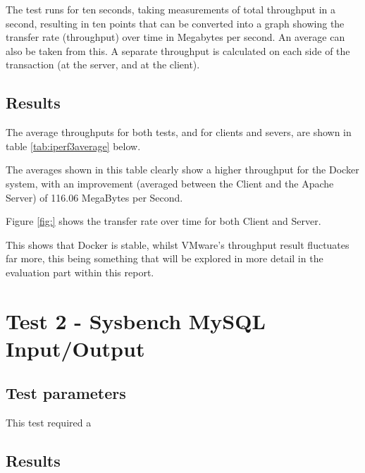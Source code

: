 The test runs for ten seconds, taking measurements of total throughput in a second, resulting in ten points that can be converted into a graph showing the transfer rate (throughput) over time in Megabytes per second. An average can also be taken from this. A separate throughput is calculated on each side of the transaction (at the server, and at the client).
 
\subsection{Results}
The average throughputs for both tests, and for clients and severs, are shown in table \ref{tab:iperf3average} below.

\begin{table}[H]
\centering
\caption{Table showing the average transfer rate in a 10 second period}
\label{tab:iperf3average}
\end{table}

The averages shown in this table clearly show a higher throughput for the Docker system, with an improvement (averaged between the Client and the Apache Server) of 116.06 MegaBytes per Second.

Figure \ref{fig:} shows the transfer rate over time for both Client and Server.


This shows that Docker is stable, whilst VMware's throughput result fluctuates far more, this being something that will be explored in more detail in the evaluation part within this report.

\section{Test 2 - Sysbench MySQL Input/Output}
\subsection{Test parameters}
This test required a 
\subsection{Results}


